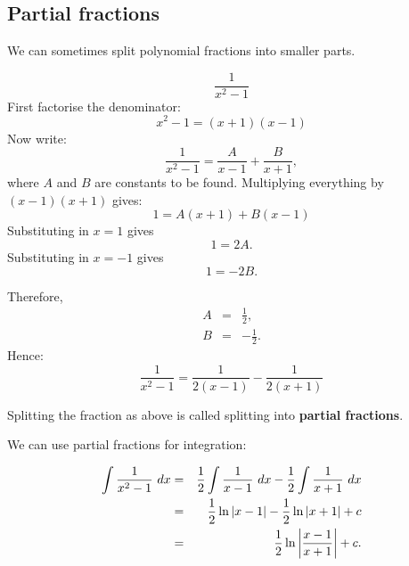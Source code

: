 \subsection{Partial fractions}

We can sometimes split polynomial fractions into smaller parts.
\begin{example}
\[\frac{1}{x^2-1}\]
First factorise the denominator:
\[x^2-1 = (x+1)(x-1)\]
Now write:
\[\frac{1}{x^2-1}=\frac{A}{x-1}+\frac{B}{x+1},\]
where $A$ and $B$ are constants to be found. Multiplying everything by $(x-1)(x+1)$ gives:
\[1=A(x+1)+B(x-1)\]
Substituting in \(x=1\) gives \[1=2A.\]
Substituting in \(x=-1\) gives \[1=-2B.\]

Therefore,
\begin{eqnarray*}
A&=&\frac{1}{2}, \\
B&=&-\frac{1}{2}.
\end{eqnarray*}
Hence:
\[\frac{1}{x^2-1}=\frac{1}{2(x-1)}-\frac{1}{2(x+1)}\]
\end{example}

\begin{definition}
Splitting the fraction as above is called splitting into \textbf{partial fractions}.
\end{definition}

We can use partial fractions for integration:

\begin{example}
\begin{eqnarray*}
\int \frac{1}{x^2-1}\ dx&=&\frac{1}{2}\int\frac{1}{x-1}\ dx-\frac{1}{2}\int\frac{1}{x+1}\ dx \\
&=&\frac{1}{2}\ln|x-1|-\frac{1}{2}\ln|x+1|+c \\
&=&\frac{1}{2}\ln\left|\frac{x-1}{x+1}\right|+c.
\end{eqnarray*}
\end{example}


